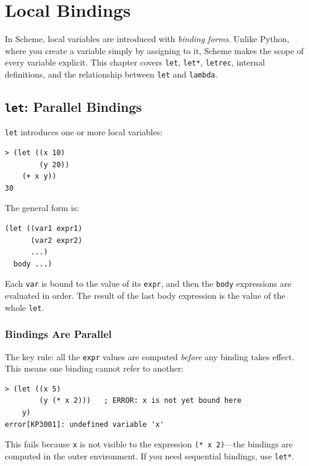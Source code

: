 \chapter{Local Bindings}
\label{ch:bindings}

In Scheme, local variables are introduced with \emph{binding forms}. Unlike Python, where you create a variable simply by assigning to it, Scheme makes the scope of every variable explicit. This chapter covers \texttt{let}, \texttt{let*}, \texttt{letrec}, internal definitions, and the relationship between \texttt{let} and \texttt{lambda}.

\section{\texttt{let}: Parallel Bindings}

\texttt{let} introduces one or more local variables:

\begin{lstlisting}[style=repl]
> (let ((x 10)
        (y 20))
    (+ x y))
30
\end{lstlisting}

The general form is:

\begin{lstlisting}
(let ((var1 expr1)
      (var2 expr2)
      ...)
  body ...)
\end{lstlisting}

Each \texttt{var} is bound to the value of its \texttt{expr}, and then the \texttt{body} expressions are evaluated in order. The result of the last body expression is the value of the whole \texttt{let}.

\subsection{Bindings Are Parallel}

The key rule: all the \texttt{expr} values are computed \emph{before} any binding takes effect. This means one binding cannot refer to another:

\begin{lstlisting}[style=repl]
> (let ((x 5)
        (y (* x 2)))   ; ERROR: x is not yet bound here
    y)
error[KP3001]: undefined variable 'x'
\end{lstlisting}

This fails because \texttt{x} is not visible to the expression \texttt{(* x 2)}---the bindings are computed in the outer environment. If you need sequential bindings, use \texttt{let*}.

